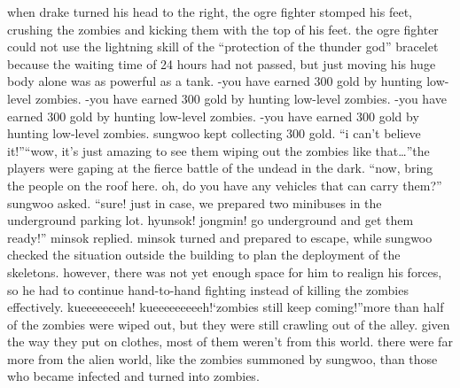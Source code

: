 when drake turned his head to the right, the ogre fighter stomped his feet, crushing the zombies and kicking them with the top of his feet.
the ogre fighter could not use the lightning skill of the “protection of the thunder god” bracelet because the waiting time of 24 hours had not passed, but just moving his huge body alone was as powerful as a tank.
-you have earned 300 gold by hunting low-level zombies.
-you have earned 300 gold by hunting low-level zombies.
-you have earned 300 gold by hunting low-level zombies.
-you have earned 300 gold by hunting low-level zombies.
sungwoo kept collecting 300 gold.
“i can’t believe it!”“wow, it’s just amazing to see them wiping out the zombies like that…”the players were gaping at the fierce battle of the undead in the dark.
“now, bring the people on the roof here.
 oh, do you have any vehicles that can carry them?” sungwoo asked.
“sure! just in case, we prepared two minibuses in the underground parking lot.
 hyunsok! jongmin! go underground and get them ready!” minsok replied.
minsok turned and prepared to escape, while sungwoo checked the situation outside the building to plan the deployment of the skeletons.
however, there was not yet enough space for him to realign his forces, so he had to continue hand-to-hand fighting instead of killing the zombies effectively.
kueeeeeeeeh! kueeeeeeeeeh!‘zombies still keep coming!”more than half of the zombies were wiped out, but they were still crawling out of the alley.
given the way they put on clothes, most of them weren’t from this world.
 there were far more from the alien world, like the zombies summoned by sungwoo, than those who became infected and turned into zombies.


